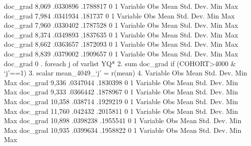    doc_grad {\VBAR}      8,069    .0330896    .1788817          0          1
{\smallskip}
    Variable {\VBAR}        Obs        Mean    Std. Dev.       Min        Max
    doc_grad {\VBAR}      7,984    .0341934     .181737          0          1
{\smallskip}
    Variable {\VBAR}        Obs        Mean    Std. Dev.       Min        Max
    doc_grad {\VBAR}      7,960    .0330402    .1787528          0          1
{\smallskip}
    Variable {\VBAR}        Obs        Mean    Std. Dev.       Min        Max
    doc_grad {\VBAR}      8,374    .0349893    .1837635          0          1
{\smallskip}
    Variable {\VBAR}        Obs        Mean    Std. Dev.       Min        Max
    doc_grad {\VBAR}      8,662    .0363657    .1872093          0          1
{\smallskip}
    Variable {\VBAR}        Obs        Mean    Std. Dev.       Min        Max
    doc_grad {\VBAR}      8,839    .0379002    .1909657          0          1
{\smallskip}
    Variable {\VBAR}        Obs        Mean    Std. Dev.       Min        Max
    doc_grad {\VBAR}          0
{\smallskip}
. foreach j of varlist YQ* {\lbr}
  2.                 sum doc_grad if (COHORT>4000 \& `j'==1)
  3.                 scalar mean_4049_`j' = r(mean)
  4. {\rbr}
{\smallskip}
    Variable {\VBAR}        Obs        Mean    Std. Dev.       Min        Max
    doc_grad {\VBAR}      9,336    .0347044    .1830398          0          1
{\smallskip}
    Variable {\VBAR}        Obs        Mean    Std. Dev.       Min        Max
    doc_grad {\VBAR}      9,333    .0366442    .1878967          0          1
{\smallskip}
    Variable {\VBAR}        Obs        Mean    Std. Dev.       Min        Max
    doc_grad {\VBAR}     10,358     .038714    .1929219          0          1
{\smallskip}
    Variable {\VBAR}        Obs        Mean    Std. Dev.       Min        Max
    doc_grad {\VBAR}     11,760     .042432    .2015811          0          1
{\smallskip}
    Variable {\VBAR}        Obs        Mean    Std. Dev.       Min        Max
    doc_grad {\VBAR}     10,898    .0398238    .1955541          0          1
{\smallskip}
    Variable {\VBAR}        Obs        Mean    Std. Dev.       Min        Max
    doc_grad {\VBAR}     10,935    .0399634    .1958822          0          1
{\smallskip}
    Variable {\VBAR}        Obs        Mean    Std. Dev.       Min        Max
